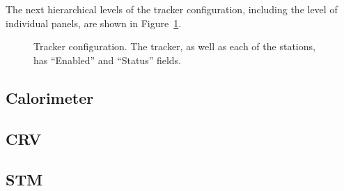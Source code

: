 The next hierarchical levels of the tracker configuration, including the level of individual panels,
are shown in Figure~\ref{figure:station_config}.

\begin{figure}[H]
  \caption{
    \label{figure:station_config}
    Tracker configuration. The tracker, as well as each of the stations, has ``Enabled'' and
    ``Status'' fields.
  }
\end{figure}

\subsection{Calorimeter} 


\subsection{CRV} 


\subsection{STM} 




